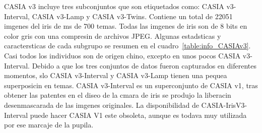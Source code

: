 CASIA v3 incluye tres subconjuntos que son etiquetados como: CASIA v3-Interval, CASIA v3-Lamp y CASIA v3-Twins. Contiene un total de 22051 imgenes del iris de ms de 700 temas. Todas las imgenes de iris son de 8 bits en color gris con una compresin de archivos JPEG. Algunas estadsticas y caractersticas de cada subgrupo se resumen en el cuadro~\ref{table:info_CASIAv3}. Casi todos los individuos son de origen chino, excepto en unos pocos CASIA v3-Interval. Debido a que los tres conjuntos de datos fueron capturados en diferentes momentos, slo CASIA v3-Interval y CASIA v3-Lamp tienen una pequea superposicin en temas.
CASIA v3-Interval es un superconjunto de CASIA v1, tras obtener las patentes en el diseo de la cmara de iris se produjo la liberacin desenmascarada de las imgenes originales. La disponibilidad de CASIA-IrisV3-Interval puede hacer CASIA V1 este obsoleta, aunque es todava muy utilizada por ese marcaje de la pupila.

\vspace{0.5cm}

